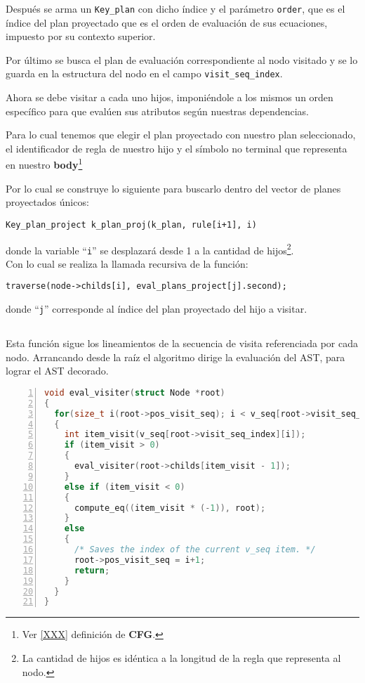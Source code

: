 Después se arma un \texttt{Key\_plan} con dicho índice y el parámetro \texttt{order}, que es el índice del plan proyectado que es el orden de evaluación de sus ecuaciones, impuesto por su contexto superior.

Por último se busca el plan de evaluación correspondiente al nodo visitado y se lo guarda en la estructura del nodo en el campo \texttt{visit\_seq\_index}.

Ahora se debe visitar a cada uno hijos, imponiéndole a los mismos un orden específico para que evalúen sus atributos según nuestras dependencias.

Para lo cual tenemos que elegir el plan proyectado con nuestro plan seleccionado, el identificador de regla de nuestro hijo y el símbolo no terminal que representa en nuestro \textbf{body}\footnote{Ver \ref{XXX} definición de \textbf{CFG}.}

Por lo cual se construye lo siguiente para buscarlo dentro del vector de planes proyectados únicos:

\begin{center}\texttt{Key\_plan\_project k\_plan\_proj(k\_plan, rule[i+1], i)}\end{center}

donde la variable ``\texttt{i}'' se desplazará desde 1 a la cantidad de hijos\footnote{La cantidad de hijos es idéntica a la longitud de la regla que representa al nodo.}.\\

Con lo cual se realiza la llamada recursiva de la función:

\begin{center}\texttt{traverse(node->childs[i], eval\_plans\_project[j].second);}\end{center}

donde ``\texttt{j}'' corresponde al índice del plan proyectado del hijo a visitar.

\subsection*{}

Esta función sigue los lineamientos de la secuencia de visita referenciada por cada nodo. Arrancando desde la raíz el algoritmo dirige la evaluación del AST, para lograr el AST decorado.

\vspace*{0.2cm}

\begin{lstlisting}[language=C++, basicstyle=\scriptsize, numbers=left, columns=fullflexible, linewidth=13cm]
void eval_visiter(struct Node *root)
{
  for(size_t i(root->pos_visit_seq); i < v_seq[root->visit_seq_index].size(); i++)
  {
    int item_visit(v_seq[root->visit_seq_index][i]);
    if (item_visit > 0)
    {
      eval_visiter(root->childs[item_visit - 1]);
    }
    else if (item_visit < 0)
    {
      compute_eq((item_visit * (-1)), root);
    }
    else
    {
      /* Saves the index of the current v_seq item. */
      root->pos_visit_seq = i+1;
      return;
    }
  }
}
\end{lstlisting}

